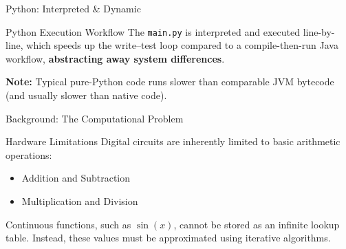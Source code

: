 \documentclass{beamer}
\begin{document}
\begin{frame}{Python: Interpreted \& Dynamic}
  \begin{center}
  \end{center}
  \vspace{0.3cm}
  \begin{alertblock}{Python Execution Workflow}
    The \texttt{main.py} is interpreted and executed line-by-line,
    which speeds up the write--test loop compared to a compile-then-run Java workflow,
    \textbf{abstracting away system differences}.
  \end{alertblock}
  \vspace{0.3cm}
  \begin{minipage}{0.96\linewidth}
    \footnotesize
    \textbf{Note:} Typical pure-Python code runs slower
    than comparable JVM bytecode (and usually slower than native code).
  \end{minipage}
\end{frame}

\begin{frame}{Background: The Computational Problem}
  \begin{block}{Hardware Limitations}
    Digital circuits are inherently limited to basic arithmetic operations:
    \begin{itemize}
      \item Addition and Subtraction
      \item Multiplication and Division
    \end{itemize}
  \end{block}
  \vspace{0.5cm}
  Continuous functions, such as $\sin(x)$, cannot be stored as an infinite lookup table. Instead, these values must be approximated using iterative algorithms.
\end{frame}
\end{document}
